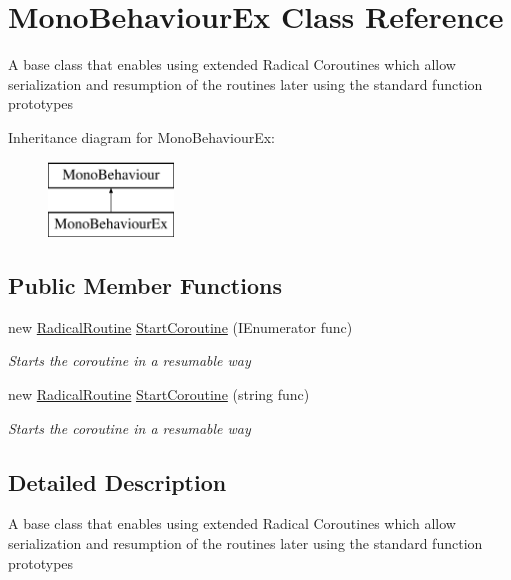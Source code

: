 \hypertarget{class_mono_behaviour_ex}{}\section{Mono\+Behaviour\+Ex Class Reference}
\label{class_mono_behaviour_ex}


A base class that enables using extended Radical Coroutines which allow serialization and resumption of the routines later using the standard function prototypes  


Inheritance diagram for Mono\+Behaviour\+Ex\+:\begin{figure}[H]
\begin{center}
\leavevmode
\includegraphics[height=2.000000cm]{class_mono_behaviour_ex}
\end{center}
\end{figure}
\subsection*{Public Member Functions}
\begin{DoxyCompactItemize}
\item 
new \hyperlink{class_radical_routine}{Radical\+Routine} \hyperlink{class_mono_behaviour_ex_a2ceccf18e7afb38fb8cdeafed63c8a8e}{Start\+Coroutine} (I\+Enumerator func)
\begin{DoxyCompactList}\small\item\em Starts the coroutine in a resumable way \end{DoxyCompactList}\item 
new \hyperlink{class_radical_routine}{Radical\+Routine} \hyperlink{class_mono_behaviour_ex_aa666e8936e8c6a60869d25cb9e5fbd76}{Start\+Coroutine} (string func)
\begin{DoxyCompactList}\small\item\em Starts the coroutine in a resumable way \end{DoxyCompactList}\end{DoxyCompactItemize}


\subsection{Detailed Description}
A base class that enables using extended Radical Coroutines which allow serialization and resumption of the routines later using the standard function prototypes 



